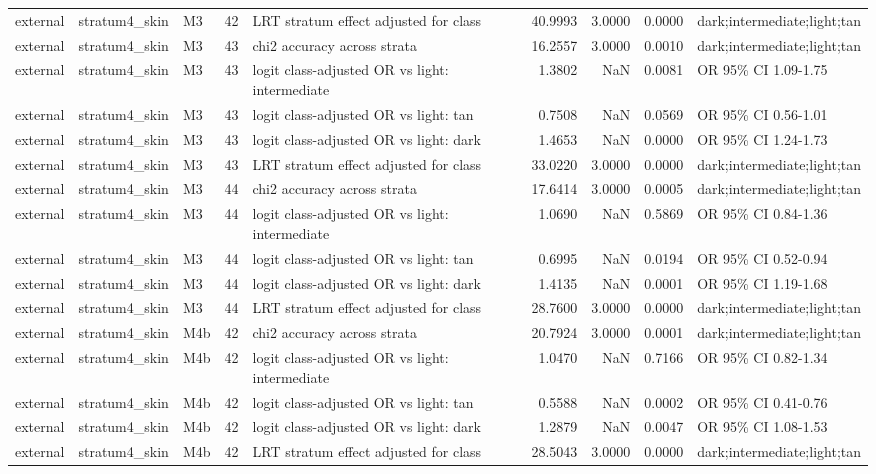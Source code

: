 \begin{tabular}{lllrlrrrl}
external & stratum4\_skin & M3 & 42 & LRT stratum effect adjusted for class & 40.9993 & 3.0000 & 0.0000 & dark;intermediate;light;tan \\
external & stratum4\_skin & M3 & 43 & chi2 accuracy across strata & 16.2557 & 3.0000 & 0.0010 & dark;intermediate;light;tan \\
external & stratum4\_skin & M3 & 43 & logit class-adjusted OR vs light: intermediate & 1.3802 & NaN & 0.0081 & OR 95\% CI 1.09-1.75 \\
external & stratum4\_skin & M3 & 43 & logit class-adjusted OR vs light: tan & 0.7508 & NaN & 0.0569 & OR 95\% CI 0.56-1.01 \\
external & stratum4\_skin & M3 & 43 & logit class-adjusted OR vs light: dark & 1.4653 & NaN & 0.0000 & OR 95\% CI 1.24-1.73 \\
external & stratum4\_skin & M3 & 43 & LRT stratum effect adjusted for class & 33.0220 & 3.0000 & 0.0000 & dark;intermediate;light;tan \\
external & stratum4\_skin & M3 & 44 & chi2 accuracy across strata & 17.6414 & 3.0000 & 0.0005 & dark;intermediate;light;tan \\
external & stratum4\_skin & M3 & 44 & logit class-adjusted OR vs light: intermediate & 1.0690 & NaN & 0.5869 & OR 95\% CI 0.84-1.36 \\
external & stratum4\_skin & M3 & 44 & logit class-adjusted OR vs light: tan & 0.6995 & NaN & 0.0194 & OR 95\% CI 0.52-0.94 \\
external & stratum4\_skin & M3 & 44 & logit class-adjusted OR vs light: dark & 1.4135 & NaN & 0.0001 & OR 95\% CI 1.19-1.68 \\
external & stratum4\_skin & M3 & 44 & LRT stratum effect adjusted for class & 28.7600 & 3.0000 & 0.0000 & dark;intermediate;light;tan \\
external & stratum4\_skin & M4b & 42 & chi2 accuracy across strata & 20.7924 & 3.0000 & 0.0001 & dark;intermediate;light;tan \\
external & stratum4\_skin & M4b & 42 & logit class-adjusted OR vs light: intermediate & 1.0470 & NaN & 0.7166 & OR 95\% CI 0.82-1.34 \\
external & stratum4\_skin & M4b & 42 & logit class-adjusted OR vs light: tan & 0.5588 & NaN & 0.0002 & OR 95\% CI 0.41-0.76 \\
external & stratum4\_skin & M4b & 42 & logit class-adjusted OR vs light: dark & 1.2879 & NaN & 0.0047 & OR 95\% CI 1.08-1.53 \\
external & stratum4\_skin & M4b & 42 & LRT stratum effect adjusted for class & 28.5043 & 3.0000 & 0.0000 & dark;intermediate;light;tan \\

\end{tabular}
